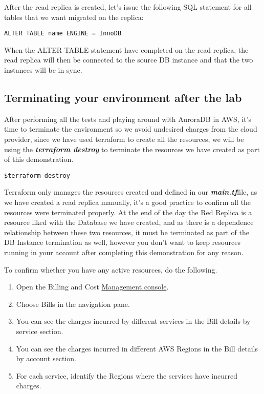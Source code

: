 \documentclass{article}
\begin{document}
After the read replica is created, let's issue the following SQL statement for all tables that we want migrated on the replica:

\begin{lstlisting}[caption=Migrating tables on the replica.]
ALTER TABLE name ENGINE = InnoDB
\end{lstlisting}

When the ALTER TABLE statement have completed on the read replica,  the read replica will then be connected to the source DB instance and that the two instances will be in sync.

\subsection{Terminating your environment after the lab}
After performing all the tests and playing around with AuroraDB in AWS, it's time to terminate the environment so we avoid undesired charges from the cloud provider, since we have used terraform to create all the resources, we will be using the \textbf{\emph{terraform destroy}} to terminate the resources we have created as part of this demonstration. 

\begin{lstlisting}[caption=Database Endpoint output]
$terraform destroy
\end{lstlisting}

Terraform only manages the resources created and defined in our \textbf{\emph{main.tf}}file, as we have created a read replica manually, it's a good practice to confirm all the resources were terminated properly. At the end of the day the Red Replica is a resource liked with the Database we have created, and as there is a dependence relationship between these two resources, it must be terminated as part of the DB Instance termination as well, however you don't want to keep resources running in your account after completing this demonstration for any reason. 
\clearpage

To confirm whether you have any active resources, do the following. 

\begin{enumerate}
    \item Open the Billing and Cost \href{https://console.aws.amazon.com/billing}{Management console}.
    \item Choose Bills in the navigation pane.
    \item You can see the charges incurred by different services in the Bill details by service section.
    \item You can see the charges incurred in different AWS Regions in the Bill details by account section.
    \item For each service, identify the Regions where the services have incurred charges.
\end{enumerate}
\end{document}
